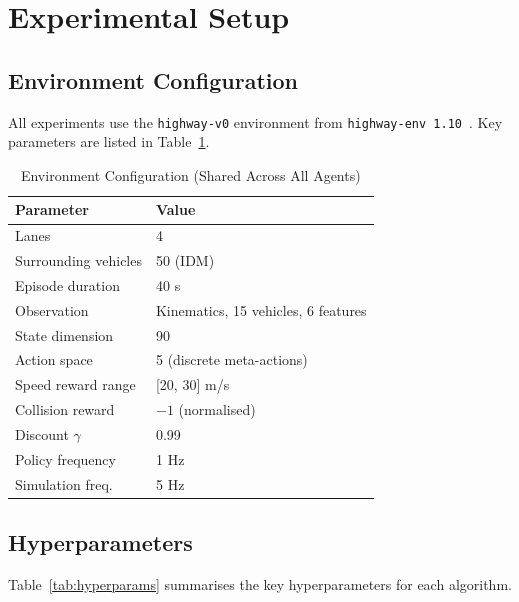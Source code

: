 \documentclass[conference]{IEEEtran}
\begin{document}
\section{Experimental Setup}

\subsection{Environment Configuration}

All experiments use the \texttt{highway-v0} environment from
\texttt{highway-env 1.10}~\cite{highway-env}. Key parameters are listed in
Table~\ref{tab:env_config}.

\begin{table}[htbp]
\centering
\caption{Environment Configuration (Shared Across All Agents)}
\label{tab:env_config}
\begin{tabular}{@{}ll@{}}
\toprule
\textbf{Parameter} & \textbf{Value} \\ \midrule
Lanes              & 4 \\
Surrounding vehicles & 50 (IDM) \\
Episode duration   & 40 s \\
Observation        & Kinematics, 15 vehicles, 6 features \\
State dimension    & 90 \\
Action space       & 5 (discrete meta-actions) \\
Speed reward range & [20, 30] m/s \\
Collision reward   & $-1$ (normalised) \\
Discount $\gamma$  & 0.99 \\
Policy frequency   & 1 Hz \\
Simulation freq.   & 5 Hz \\
\bottomrule
\end{tabular}
\end{table}

\subsection{Hyperparameters}

Table~\ref{tab:hyperparams} summarises the key hyperparameters for each algorithm.
\end{document}
